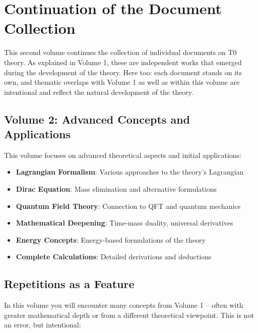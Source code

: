 \section*{Continuation of the Document Collection}

This second volume continues the collection of individual documents on T0 theory. As explained in Volume 1, these are independent works that emerged during the development of the theory. Here too: each document stands on its own, and thematic overlaps with Volume 1 as well as within this volume are intentional and reflect the natural development of the theory.

\subsection*{Volume 2: Advanced Concepts and Applications}

This volume focuses on advanced theoretical aspects and initial applications:

\begin{itemize}
\item \textbf{Lagrangian Formalism}: Various approaches to the theory's Lagrangian
\item \textbf{Dirac Equation}: Mass elimination and alternative formulations
\item \textbf{Quantum Field Theory}: Connection to QFT and quantum mechanics
\item \textbf{Mathematical Deepening}: Time-mass duality, universal derivatives
\item \textbf{Energy Concepts}: Energy-based formulations of the theory
\item \textbf{Complete Calculations}: Detailed derivations and deductions
\end{itemize}

\subsection*{Repetitions as a Feature}

In this volume you will encounter many concepts from Volume 1 -- often with greater mathematical depth or from a different theoretical viewpoint. This is not an error, but intentional:

